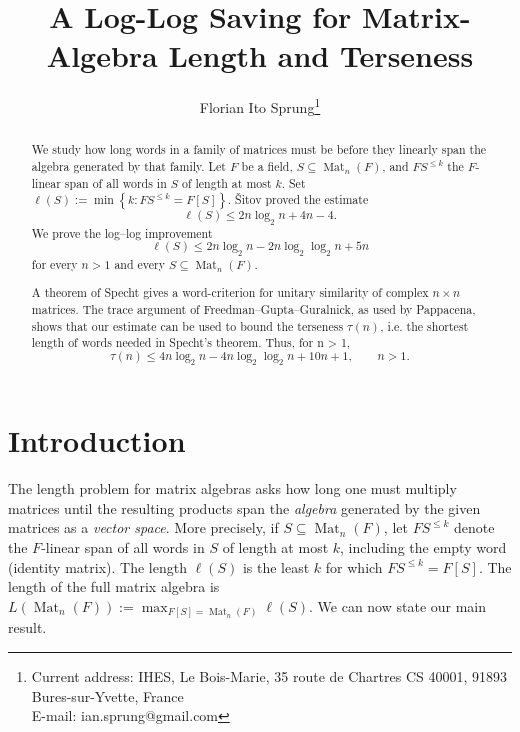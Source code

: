 \documentclass[11pt]{article}
\title{\bfseries A Log-Log Saving for Matrix-Algebra Length and Terseness}
\author{ Florian Ito Sprung\footnote{Current address: IHES, Le Bois-Marie, 35 route de Chartres  CS 40001,  91893 Bures-sur-Yvette, France\\ E-mail: ian.sprung@gmail.com}}
\date{}
\renewcommand{\leq}{\leqslant}
\newcommand{\Mat}{\operatorname{Mat}}
\newtheorem{auxiliary proposition}[theorem]{Auxiliary Proposition}
\newtheorem{main conjecture}[theorem]{Main Conjecture}
\newtheorem{main theorem}[theorem]{Main Theorem}
\newtheorem{modesty proposition}[theorem]{Modesty Proposition}
\newtheorem{open problem}[theorem]{Open Problem}
\newtheorem{convergence lemma}[theorem]{Convergence Lemma}
\newtheorem{corrected lemma}[theorem]{Corrected Lemma}
\newtheorem{growth lemma}[theorem]{Growth Lemma}
\newtheorem{coefficient lemma}[theorem]{Integrality Lemma}
\newtheorem{interpolation lemma}[theorem]{Interpolation Lemma}
\newtheorem{kernel lemma}[theorem]{Kernel Lemma}
\newtheorem{limit lemma}[theorem]{Limit Lemma}
\newtheorem{tandem lemma}[theorem]{Modesty Lemma}
\newtheorem{zero-finding lemma}[theorem]{Zero-Finding Lemma}
\numberwithin{equation}{section}
\begin{document}
\maketitle


\begin{abstract}
We study how long words in a family of matrices must be before they linearly span the algebra generated by that family. Let $F$ be a field, $S\subseteq \Mat_n(F)$, and $FS^{\leq k}$ the $F$-linear span of all words in $S$ of length at most $k$. Set
$\ell(S):=\min\left\{k:FS^{\leq k}=F[S]\right\}.$
\v{S}itov proved the estimate
$$ \ell(S)\leq 2n\log_2 n+4n-4. $$
We prove the log--log improvement
$$ \ell(S)\leq 2n\log_2 n-2n\log_2\log_2 n+5n $$
for every $n>1$ and every $S\subseteq \Mat_n(F)$.

A theorem of Specht gives a word-criterion for unitary similarity of complex $n \times n$ matrices.
The trace argument of Freedman–Gupta–Guralnick, as used by Pappacena, shows that our estimate can be used to bound the terseness $\tau(n)$, i.e. the shortest length of words needed in Specht’s theorem. Thus, for n > 1,
$$ \tau(n)\leq 4n\log_2 n-4n\log_2\log_2 n+10n+1,\qquad n>1. $$

\end{abstract}


\section{Introduction}

The length problem for matrix algebras asks how long one must multiply matrices until the resulting products span the \textit{algebra} generated by the given matrices as a \textit{vector space}.  More precisely, if $S\subseteq \Mat_n(F)$, let $F S^{\leq k}$ denote the $F$-linear span of all words in $S$ of length at most $k$, including the empty word (identity matrix). %
The length $\ell(S)$ is the least $k$ for which $FS^{\leq k}=F[S]$.  The  %
length of the full matrix algebra is $L(\Mat_n(F)):=\max_{F[S]=\Mat_n(F)}\ell(S).$ We can now state our main result.
\end{document}
